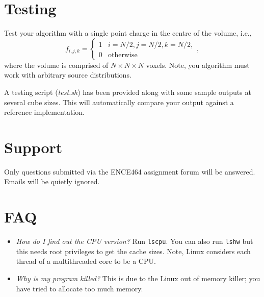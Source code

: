 \documentclass[a4paper,11pt]{article}
\newcommand{\code}[1]{\texttt{#1}}
\begin{document}
\section{Testing}

Test your algorithm with a single point charge in the centre of the
volume, i.e.,
%
\begin{equation}
  f_{i,j,k} = \left\{
  \begin{array}{ll}
    1 & i=N/2, j=N/2, k=N/2, \\
    0 & \mbox{otherwise}
  \end{array}\right.,
\end{equation}
%
where the volume is comprised of $N \times N \times N$ voxels.  Note,
you algorithm must work with arbitrary source distributions.

A testing script (\emph{test.sh}) has been provided along with some sample
outputs at several cube sizes. This will automatically compare your output
against a reference implementation.




\section{Support}

Only questions submitted via the ENCE464 assignment forum will be
answered.  Emails will be quietly ignored.


\section{FAQ}

\begin{itemize}
\item \emph{How do I find out the CPU version?}  Run \code{lscpu}.
  You can also run \code{lshw} but this needs root privileges to get
  the cache sizes.  Note, Linux considers each thread of a
  multithreaded core to be a CPU.

\item \emph{Why is my program killed?}  This is due to the Linux out
  of memory killer; you have tried to allocate too much memory.



\end{itemize}
\end{document}
